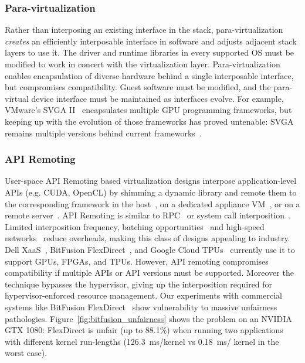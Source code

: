 \subsubsection{Para-virtualization}
Rather than interposing an existing interface in the stack,
para-virtualization~\cite{suzuki2014gpuvm,dowty2009gpu,vasila-gvm16,
vmm-independent-gfx-vee07,harel-efficient13atc,exitless-paravirtual-io,
vmm-bypass-atc06, self-virt-hpdc07,vmware-hosted-io-atc01,
direct-access-virt-io-atc08, paradice} \emph{creates} an efficiently
interposable interface in software and adjusts adjacent stack layers to use
it. The driver and runtime libraries in every supported OS must be
modified to work in concert with the virtualization layer.
Para-virtualization enables encapsulation of diverse hardware behind a single
interposable interface, but compromises compatibility. Guest software must be
modified, and the para-virtual device interface must be maintained as
interfaces evolve.
For example, VMware's SVGA II~\cite{dowty2009gpu} encapsulates multiple GPU
programming frameworks, but keeping up with the evolution of those frameworks
has proved untenable: SVGA remains multiple versions behind current
frameworks~\cite{vmware_version,svga_guest}.

\subsubsection{API Remoting}
User-space API Remoting based virtualization designs interpose
application-level APIs (e.g. CUDA, OpenCL) by shimming a dynamic library and
remote them to the corresponding framework in the host~\cite{shi2012vcuda,
gupta2009gvim, gVirtuS}, on a dedicated appliance VM~\cite{vmCUDA}, or on a
remote server~\cite{rCUDA,rCUDAnew,GridCuda,kim2012snucl,VCL,Duato2009,Li2011}.
API Remoting is similar to RPC~\cite{nfs,sunrpc} or system call
interposition~\cite{paradice, nooks, rio, vrio}.
Limited interposition frequency, batching opportunities~\cite{rCUDA} and
high-speed networks~\cite{deplyrcuda, bitfusion} reduce overheads, making this
class of designs appealing to industry. Dell XaaS~\cite{xaas}, BitFusion
FlexDirect~\cite{bitfusion}, and Google Cloud TPUs~\cite{cloud-tpu} currently
use it to support GPUs, FPGAs, and TPUs.
However, API remoting compromises compatibility if multiple APIs or API
versions must be supported. Moreover the technique bypasses the hypervisor,
giving up the interposition required for hypervisor-enforced resource
management. Our experiments with commercial systems like BitFusion
FlexDirect~\cite{bitfusion} show vulnerability to massive unfairness
pathologies. Figure~\ref{fig:bitfusion_unfairness} shows the problem on an
NVIDIA GTX 1080: FlexDirect is unfair (up to 88.1\%) when running two
applications with different kernel run-lengths (126.3~ms/kernel vs 0.18~ms/
kernel in the worst case).

